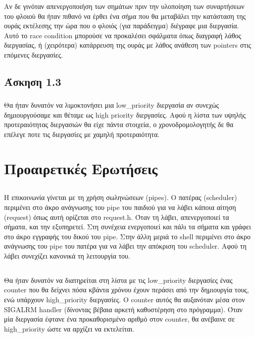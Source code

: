 \documentclass[a4paper,10pt]{article} \usepackage{anysize}
\begin{document}
\subsubsection{}
Αν δε γινόταν απενεργοποιήση των σημάτων πριν την υλοποίηση των συναρτήσεων
του φλοιού θα ήταν πιθανό να έρθει ένα σήμα που θα μεταβάλει την κατάσταση της
ουράς εκτέλεσης την ώρα που ο φλοιός (για παράδειγμα) διέγραφε μια διεργασία.
Αυτό το race condition μπορούσε να προκαλέσει σφάλματα όπως διαγραφή λάθος
διεργασίας, ή (χειρότερα) κατάρρευση της ουράς με λάθος ανάθεση των pointers
στις επόμενες διεργασίες.

\subsection{Άσκηση 1.3}
\subsubsection{}
Θα ήταν δυνατόν να λιμοκτονήσει μια low\_priority διεργασία αν συνεχώς
δημιουργούσαμε και θέταμε ως high priority διεργασίες. Αφού η λίστα των υψηλής
προτεραιότητας διεργασιών θα είχε πάντα στοιχεία, ο χρονοδρομολογητής δε θα
επέλεγε ποτε τις διεργασίες με χαμηλή προτεραιότητα.

\section*{Προαιρετικές Ερωτήσεις}
\setcounter{section}{4}
\setcounter{subsection}{0}
\subsection{}
Η επικοινωνία γίνεται με τη χρήση σωληνώσεων (pipes). Ο πατέρας (scheduler)
περιμένει στο άκρο ανάγνωσης του pipe του παιδιού για να λάβει κάποια αίτηση 
(request) όπως αυτή ορίζεται στο request.h. Όταν τη λάβει, απενεργοποιεί τα σήματα, 
και την εξυπηρετεί. Στη συνέχεια ενεργοποιεί και πάλι τα σήματα και γράφει στο άκρο
εγγραφής του δικού του pipe. Στην άλλη μεριά το shell περιμένει στο άκρο
ανάγνωσης του pipe του πατέρα για να λάβει την απόκριση του scheduler.
Αφού τη λάβει συνεχίζει κανονικά τη λειτουργία του.

\subsection{}
Θα ήταν δυνατόν να διατηρείται στη λίστα με τις low\_priority διεργασίες ένας
counter που θα δείχνει πόσα κβάντα χρόνου έχουν περάσει από την δημιουργία
τους, ενώ υπάρχουν high\_priority διεργασίες. Ο counter αυτός θα αυξανόταν μέσα
στον SIGALRM handler (δίνοντας βέβαια αρκετή καθυστέρηση στο πρόγραμμα). Όταν
μία διεργασία έφτανε ένα προκαθορισμένο αριθμό στον counter, θα ανέβαινε σε
high\_priority ώστε να αρχίζει να εκτελείται.
\end{document}
